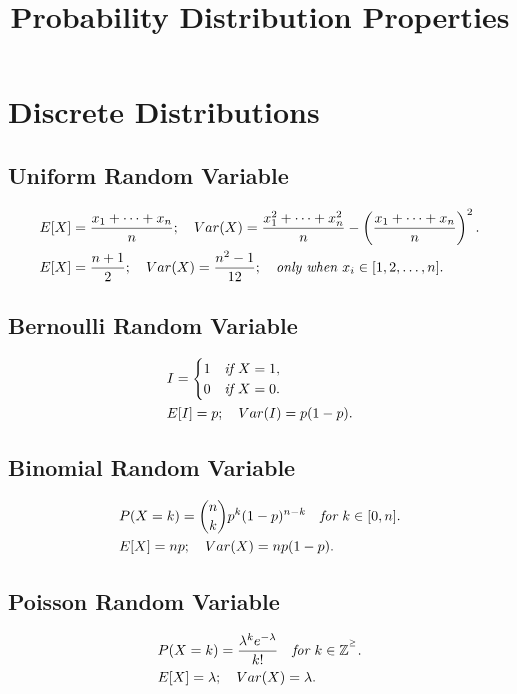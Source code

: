 \documentclass{article}
\title{Probability Distribution Properties}
\begin{document}
 
\date{}

\maketitle 
\section{Discrete Distributions}
\subsection{Uniform Random Variable}
\begin{align*}
    & E[X] = \frac{x_1 + \dots + x_n}{n}; \quad Var(X) = \frac{x_1^2 + \dots + x_n^2}{n} - \left(\frac{x_1 + \dots + x_n}{n}\right)^2. \\
    & E[X] = \frac{n+1}{2}; \quad Var(X) = \frac{n^2-1}{12}; \quad \emph{only when $x_i \in [1, 2, \dots, n]$}.
\end{align*}

\subsection{Bernoulli Random Variable}
\begin{align*}
    & I = \begin{cases}
        1 & \emph{if $X = 1$}, \\
        0 & \emph{if $X = 0$}.
    \end{cases} \\
    & E[I] = p; \quad Var(I) = p(1-p).
\end{align*}

\subsection{Binomial Random Variable}
\begin{align*}
    & P(X=k) = {n\choose k}p^k(1-p)^{n-k} \quad \emph{for } k \in [0,n]. \\
    & E[X] = np; \quad Var(X) = np(1-p).
\end{align*}

\subsection{Poisson Random Variable}
\begin{align*}
    & P(X=k) = \frac{\lambda^k e^{-\lambda}}{k!} \quad \emph{for } k \in \mathbb{Z}^{^\ge}. \\
    & E[X] = \lambda; \quad Var(X) = \lambda.
\end{align*}
\end{document}
